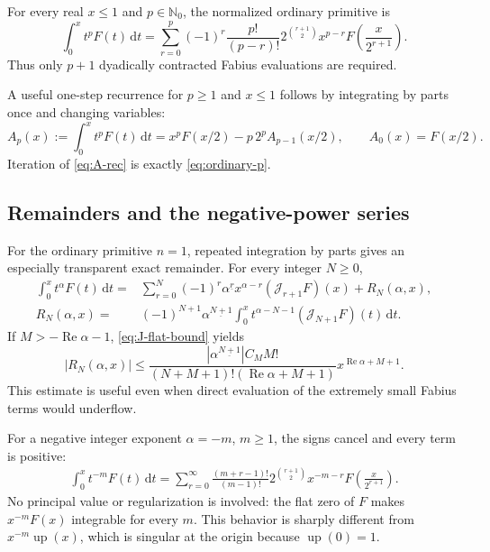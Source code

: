 \documentclass[11pt,oneside]{article}
\theoremstyle{definition}
\theoremstyle{remark}
\newcommand{\Up}{\operatorname{up}}
\newcommand{\N}{\mathbb N}
\newcommand{\dd}{\,\mathrm d}
\newcommand{\fall}[2]{#1^{\underline{#2}}}
\newcommand{\Jn}{\mathcal J}
\newcommand{\1}{\mathbf 1}
\DeclareMathOperator{\Rea}{Re}
\begin{document}
\begin{resultbox}
For every real \(x\leq1\) and \(p\in\N_0\), the normalized ordinary primitive
is
\begin{equation}
 \int_0^x t^pF(t)\dd t
 =\sum_{r=0}^{p}(-1)^r\frac{p!}{(p-r)!}
 2^{\binom{r+1}{2}}x^{p-r}
 F\!\left(\frac{x}{2^{r+1}}\right).                            \label{eq:ordinary-p}
\end{equation}
Thus only \(p+1\) dyadically contracted Fabius evaluations are required.
\end{resultbox}

A useful one-step recurrence for \(p\geq1\) and \(x\leq1\) follows by
integrating by parts once and changing variables:
\begin{equation}
 A_p(x):=\int_0^xt^pF(t)\dd t
 =x^pF(x/2)-p\,2^pA_{p-1}(x/2),\qquad A_0(x)=F(x/2).             \label{eq:A-rec}
\end{equation}
Iteration of \eqref{eq:A-rec} is exactly \eqref{eq:ordinary-p}.

\subsection{Remainders and the negative-power series}
For the ordinary primitive \(n=1\), repeated integration by parts gives an
especially transparent exact remainder.  For every integer \(N\geq0\),
\begin{align}
 \int_0^xt^\alpha F(t)\dd t
 ={}&\sum_{r=0}^{N}(-1)^r\fall{\alpha}{r}
 x^{\alpha-r}(\Jn_{r+1}F)(x)+R_N(\alpha,x),                    \label{eq:partial-alpha}\\
 R_N(\alpha,x)
 ={}&(-1)^{N+1}\fall{\alpha}{N+1}
 \int_0^xt^{\alpha-N-1}(\Jn_{N+1}F)(t)\dd t.                  \label{eq:remainder-alpha}
\end{align}
If \(M> -\Rea\alpha-1\), \eqref{eq:J-flat-bound} yields
\begin{equation}
 |R_N(\alpha,x)|
 \leq
 \frac{|\fall{\alpha}{N+1}|C_MM!}
 {(N+M+1)!(\Rea\alpha+M+1)}
 x^{\Rea\alpha+M+1}.                                         \label{eq:remainder-bound}
\end{equation}
This estimate is useful even when direct evaluation of the extremely small
Fabius terms would underflow.

For a negative integer exponent \(\alpha=-m\), \(m\geq1\), the signs cancel
and every term is positive:
\begin{equation}
 \boxed{\begin{aligned}
 \int_0^xt^{-m}F(t)\dd t
 =\sum_{r=0}^{\infty}
 \frac{(m+r-1)!}{(m-1)!}
 2^{\binom{r+1}{2}}x^{-m-r}
 F\!\left(\frac{x}{2^{r+1}}\right).
 \end{aligned}}                                                \label{eq:negative-series}
\end{equation}
No principal value or regularization is involved: the flat zero of \(F\) makes
\(x^{-m}F(x)\) integrable for every \(m\).  This behavior is sharply different
from \(x^{-m}\Up(x)\), which is singular at the origin because \(\Up(0)=1\).
\end{document}
